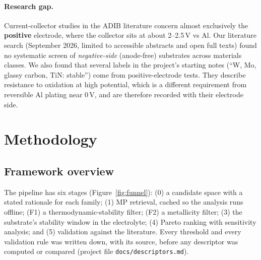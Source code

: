 \paragraph{Research gap.} Current-collector studies in the ADIB literature concern almost exclusively the \textbf{positive} electrode, where the collector sits at about 2--2.5\,V vs Al. Our literature search (September 2026, limited to accessible abstracts and open full texts) found no systematic screen of \emph{negative-side} (anode-free) substrates across materials classes. We also found that several labels in the project's starting notes (``W, Mo, glassy carbon, TiN: stable'') come from positive-electrode tests. They describe resistance to oxidation at high potential, which is a different requirement from reversible Al plating near 0\,V, and are therefore recorded with their electrode side.

\section{Methodology}
\label{sec:method}

\subsection{Framework overview}
The pipeline has six stages (Figure~\ref{fig:funnel}): (0) a candidate space with a stated rationale for each family; (1) MP retrieval, cached so the analysis runs offline; (F1) a thermodynamic-stability filter; (F2) a metallicity filter; (3) the substrate's stability window in the electrolyte; (4) Pareto ranking with sensitivity analysis; and (5) validation against the literature. Every threshold and every validation rule was written down, with its source, before any descriptor was computed or compared (project file \texttt{docs/descriptors.md}).

